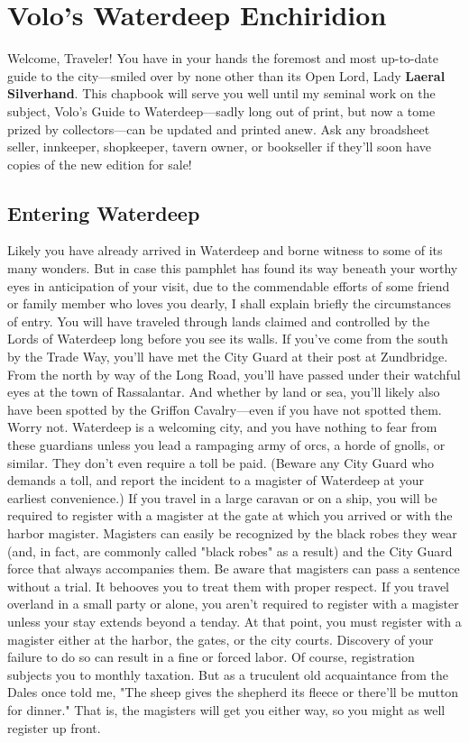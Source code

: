 \documentclass[10pt,a4paper,twoside,twocolumn,openany,nodeprecatedcode]{dndbook}
\begin{document}
\chapter{Volo's Waterdeep Enchiridion}
Welcome, Traveler! You have in your hands the foremost and most up-to-date guide to the city—smiled over by none other than its Open Lord, Lady \textbf{Laeral Silverhand}. This chapbook will serve you well until my seminal work on the subject, Volo's Guide to Waterdeep—sadly long out of print, but now a tome prized by collectors—can be updated and printed anew. Ask any broadsheet seller, innkeeper, shopkeeper, tavern owner, or bookseller if they'll soon have copies of the new edition for sale!
\section{Entering Waterdeep}
Likely you have already arrived in Waterdeep and borne witness to some of its many wonders. But in case this pamphlet has found its way beneath your worthy eyes in anticipation of your visit, due to the commendable efforts of some friend or family member who loves you dearly, I shall explain briefly the circumstances of entry.
You will have traveled through lands claimed and controlled by the Lords of Waterdeep long before you see its walls. If you've come from the south by the Trade Way, you'll have met the City Guard at their post at Zundbridge. From the north by way of the Long Road, you'll have passed under their watchful eyes at the town of Rassalantar. And whether by land or sea, you'll likely also have been spotted by the Griffon Cavalry—even if you have not spotted them.
Worry not. Waterdeep is a welcoming city, and you have nothing to fear from these guardians unless you lead a rampaging army of orcs, a horde of gnolls, or similar. They don't even require a toll be paid. (Beware any City Guard who demands a toll, and report the incident to a magister of Waterdeep at your earliest convenience.)
If you travel in a large caravan or on a ship, you will be required to register with a magister at the gate at which you arrived or with the harbor magister. Magisters can easily be recognized by the black robes they wear (and, in fact, are commonly called "black robes" as a result) and the City Guard force that always accompanies them. Be aware that magisters can pass a sentence without a trial. It behooves you to treat them with proper respect.
If you travel overland in a small party or alone, you aren't required to register with a magister unless your stay extends beyond a tenday. At that point, you must register with a magister either at the harbor, the gates, or the city courts. Discovery of your failure to do so can result in a fine or forced labor. Of course, registration subjects you to monthly taxation. But as a truculent old acquaintance from the Dales once told me, "The sheep gives the shepherd its fleece or there'll be mutton for dinner." That is, the magisters will get you either way, so you might as well register up front.
\end{document}
